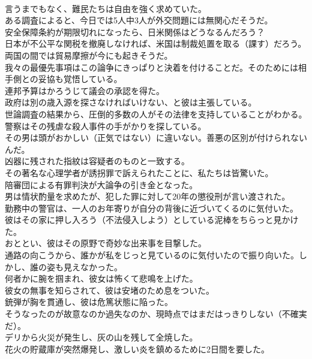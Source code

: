 \documentclass[8pt]{extreport}
\begin{document}
\begin{CJK}{UTF8}{min}
\\	言うまでもなく、難民たちは自由を強く求めていた。
\\	ある調査によると、今日では5人中3人が外交問題には無関心だそうだ。
\\	安全保障条約が期限切れになったら、日米関係はどうなるんだろう？
\\	日本が不公平な関税を撤廃しなければ、米国は制裁処置を取る（課す）だろう。
\\	両国の間では貿易摩擦が今にも起きそうだ。
\\	我々の最優先事項はこの論争にきっぱりと決着を付けることだ。そのためには相手側との妥協も覚悟している。
\\	連邦予算はかろうじて議会の承認を得た。
\\	政府は別の歳入源を探さなければいけない、と彼は主張している。
\\	世論調査の結果から、圧倒的多数の人がその法律を支持していることがわかる。
\\	警察はその残虐な殺人事件の手がかりを探している。
\\	その男は頭がおかしい（正気ではない）に違いない。善悪の区別が付けられないんだ。
\\	凶器に残された指紋は容疑者のものと一致する。
\\	その著名な心理学者が誘拐罪で訴えられたことに、私たちは皆驚いた。
\\	陪審団による有罪判決が大論争の引き金となった。
\\	男は情状酌量を求めたが、犯した罪に対して20年の懲役刑が言い渡された。
\\	勤務中の警官は、一人のお年寄りが自分の背後に近づいてくるのに気付いた。
\\	彼はその家に押し入ろう（不法侵入しよう）としている泥棒をちらっと見かけた。
\\	おととい、彼はその原野で奇妙な出来事を目撃した。
\\	通路の向こうから、誰かが私をじっと見ているのに気付いたので振り向いた。しかし、誰の姿も見えなかった。
\\	何者かに腕を掴まれ、彼女は怖くて悲鳴を上げた。
\\	彼女の無事を知らされて、彼は安堵のため息をついた。
\\	銃弾が胸を貫通し、彼は危篤状態に陥った。
\\	そうなったのが故意なのか過失なのか、現時点ではまだはっきりしない（不確実だ）。
\\	デリから火災が発生し、灰の山を残して全焼した。
\\	花火の貯蔵庫が突然爆発し、激しい炎を鎮めるために2日間を要した。

\end{CJK}
\end{document}
